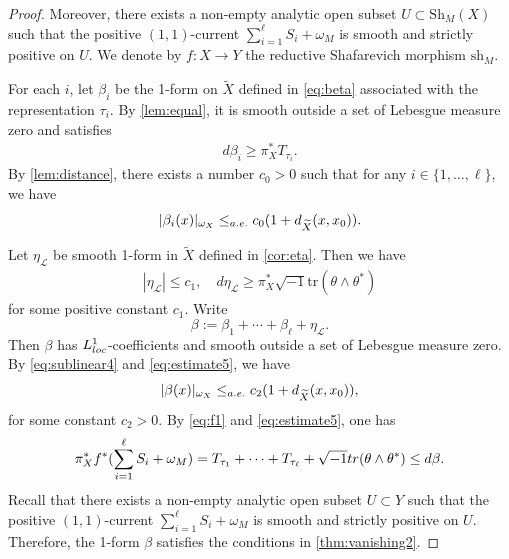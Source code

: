 \documentclass[11pt,a4paper,english]{smfart}
\theoremstyle{plain}
\theoremstyle{definition}
\theoremstyle{plain}
\def\cL{\mathcal{L}}
\begin{document}
\begin{proof}
Moreover, there exists a non-empty analytic open subset \( U \subset \mathrm{Sh}_M(X) \) such that the positive \( (1,1) \)-current
$
\sum_{i=1}^\ell S_i + \omega_M
$ 
is smooth and strictly positive on \( U \). We denote by \( f : X \to Y \) the reductive Shafarevich morphism \( \mathrm{sh}_M \). 
	
	\medspace
	
	For each $i$, let  $\beta_i$ be  the 1-form on $\widetilde{X}$ defined in \eqref{eq:beta} associated with the representation $\tau_i$. By \cref{lem:equal}, it is smooth outside a set of Lebesgue measure zero and satisfies 
	\begin{align}\label{eq:f1}
		d\beta_i\geq \pi_X^*T_{\tau_i}.
	\end{align}	 	By \cref{lem:distance}, 	 there exists  	a number $c_0>0$    such that for any $i\in\{1,\ldots,\ell\}$, we have
	\begin{align}\label{eq:sublinear4}
		|\beta_i(x)|_{\omega_X} \leq_{\rm a.e.} c_0(1+d_{\widetilde{X}}(x, x_0)).
	\end{align}   
	
	Let $\eta_\cL$ be  smooth 1-form in $\widetilde{X}$ defined in \cref{cor:eta}. Then we have 
	\begin{align} \label{eq:estimate5}
		|\eta_\cL|\leq c_1,\quad d\eta_\cL\geq \pi_X^*\sqrt{-1}\mathrm{tr}(\theta \wedge \theta^*) 
	\end{align}  
	for some positive constant $ c_1$.    
	Write 
	$$\beta:=\beta_1+\cdots+\beta_\ell+\eta_\cL. $$ Then $\beta$ has $L_{\rm loc}^1$-coefficients and smooth  outside a set of Lebesgue measure zero.  By \eqref{eq:sublinear4} and \eqref{eq:estimate5}, we have
	\begin{align}\label{eq:bound}
		|\beta(x)|_{\omega_X}\leq_{\rm a.e.} c_2(1+d_{\widetilde{X}}(x, x_0)),
	\end{align} 
	for some constant $c_2>0$. 
	By  \eqref{eq:f1} and \eqref{eq:estimate5}, one has \begin{align}\label{eq:kahlerpara}
		\pi_X^*f^*( \sum_{i=1}^\ell S_i + \omega_M)=	T_{\tau_1}+\cdots+T_{\tau_\ell}+\sqrt{-1}{\rm tr}(\theta\wedge\theta^*)\leq  	  d\beta.   
	\end{align}  
	Recall that there exists a non-empty analytic open subset \( U \subset Y \) such that the positive \( (1,1) \)-current
	$
	\sum_{i=1}^\ell S_i + \omega_M
	$
	is smooth and strictly positive on \( U \).
	Therefore,   the 1-form $\beta$ satisfies   the conditions in \cref{thm:vanishing2}.  
	

\end{proof}
\end{document}
